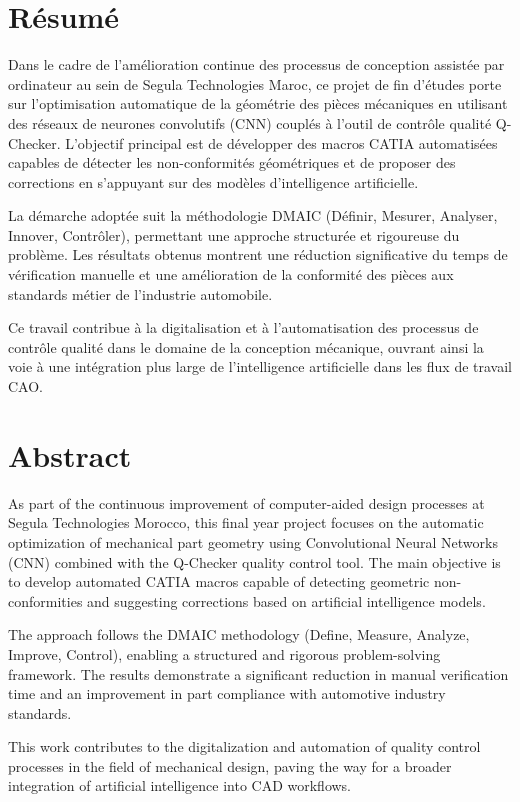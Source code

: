 \thispagestyle{plain}
\chapter*{Résumé}

Dans le cadre de l'amélioration continue des processus de conception assistée par ordinateur au sein de Segula Technologies Maroc, ce projet de fin d'études porte sur l'optimisation automatique de la géométrie des pièces mécaniques en utilisant des réseaux de neurones convolutifs (CNN) couplés à l'outil de contrôle qualité Q-Checker. L'objectif principal est de développer des macros CATIA automatisées capables de détecter les non-conformités géométriques et de proposer des corrections en s'appuyant sur des modèles d'intelligence artificielle.

La démarche adoptée suit la méthodologie DMAIC (Définir, Mesurer, Analyser, Innover, Contrôler), permettant une approche structurée et rigoureuse du problème. Les résultats obtenus montrent une réduction significative du temps de vérification manuelle et une amélioration de la conformité des pièces aux standards métier de l'industrie automobile.

Ce travail contribue à la digitalisation et à l'automatisation des processus de contrôle qualité dans le domaine de la conception mécanique, ouvrant ainsi la voie à une intégration plus large de l'intelligence artificielle dans les flux de travail CAO.


\MediaOptionLogicBlank

\chapter*{Abstract}

As part of the continuous improvement of computer-aided design processes at Segula Technologies Morocco, this final year project focuses on the automatic optimization of mechanical part geometry using Convolutional Neural Networks (CNN) combined with the Q-Checker quality control tool. The main objective is to develop automated CATIA macros capable of detecting geometric non-conformities and suggesting corrections based on artificial intelligence models.

The approach follows the DMAIC methodology (Define, Measure, Analyze, Improve, Control), enabling a structured and rigorous problem-solving framework. The results demonstrate a significant reduction in manual verification time and an improvement in part compliance with automotive industry standards.

This work contributes to the digitalization and automation of quality control processes in the field of mechanical design, paving the way for a broader integration of artificial intelligence into CAD workflows.


\MediaOptionLogicBlank